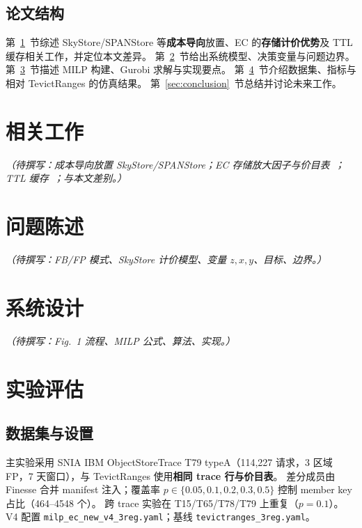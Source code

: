 \documentclass[conference]{IEEEtran}
\begin{document}
\subsection{论文结构}

第~\ref{sec:related}~节综述 SkyStore/SPANStore 等\textbf{成本导向}放置、EC 的\textbf{存储计价优势}及 TTL 缓存相关工作，并定位本文差异。
第~\ref{sec:problem}~节给出系统模型、决策变量与问题边界。
第~\ref{sec:design}~节描述 MILP 构建、Gurobi 求解与实现要点。
第~\ref{sec:eval}~节介绍数据集、指标与相对 TevictRanges 的仿真结果。
第~\ref{sec:conclusion}~节总结并讨论未来工作。

\section{相关工作}
\label{sec:related}
\noindent\textit{（待撰写：成本导向放置 SkyStore/SPANStore；EC 存储放大因子与价目表~\cite{azure_ec2012,plank2013,uluyol2020}；TTL 缓存~\cite{ttl_cc2019,adaptive_ttl2018}；与本文差别。）}

\section{问题陈述}
\label{sec:problem}
\noindent\textit{（待撰写：FB/FP 模式、SkyStore 计价模型、变量 $z,x,y$、目标、边界。）}

\section{系统设计}
\label{sec:design}
\noindent\textit{（待撰写：Fig.~1 流程、MILP 公式、算法、实现。）}

\section{实验评估}
\label{sec:eval}

\subsection{数据集与设置}

主实验采用 SNIA IBM ObjectStoreTrace T79 typeA（114{,}227 请求，3 区域 FP，7 天窗口），与 TevictRanges 使用\textbf{相同 trace 行与价目表}。
差分成员由 Finesse 合并 manifest 注入；覆盖率 $p\in\{0.05,0.1,0.2,0.3,0.5\}$ 控制 member key 占比（464--4548 个）。
跨 trace 实验在 T15/T65/T78/T79 上重复（$p{=}0.1$）。
V4 配置 \texttt{milp\_ec\_new\_v4\_3reg.yaml}；基线 \texttt{tevictranges\_3reg.yaml}。
\end{document}
